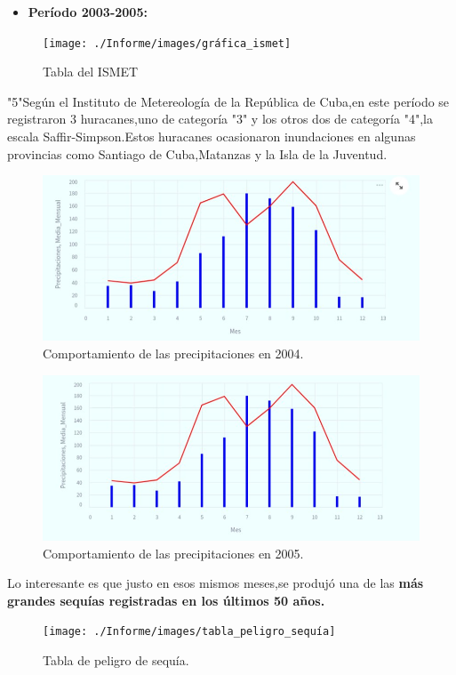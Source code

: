 \documentclass[12pt]{article}
\begin{document}
\begin{itemize}
	\item\textbf{Período 2003-2005:}
\end{itemize}

\begin{figure}[H]
	\centering
	\texttt{[image: ./Informe/images/gráfica\_ismet]}
	\caption{Tabla del ISMET}
	\label{fig:graficaismet}
\end{figure}


"5"Según el Instituto de Metereología de la República de Cuba,en este período se registraron 3 huracanes,uno de categoría "3" y los otros dos de categoría "4",la escala Saffir-Simpson.Estos huracanes ocasionaron inundaciones en algunas provincias como Santiago de Cuba,Matanzas y la Isla de la Juventud.\\


\begin{figure}[H]
	\centering
	\includegraphics[width=0.7\linewidth]{./Informe/images/precipitaciones_2004}
	\caption{Comportamiento de las precipitaciones en 2004.}
	\label{fig:precipitaciones2004}
\end{figure}


\begin{figure}[H]
	\centering
	\includegraphics[width=0.7\linewidth]{./Informe/images/precipitaciones_2005}
	\caption{Comportamiento de las precipitaciones en 2005.}
	\label{fig:precipitaciones2005}
\end{figure}


Lo interesante es que justo en esos mismos meses,se produjó una de las\textbf{ más grandes sequías registradas en los últimos 50 años.}


\begin{figure}[H]
	\centering
	\texttt{[image: ./Informe/images/tabla\_peligro\_sequía]}
	\caption{Tabla de peligro de sequía.}
	\label{fig:tablapeligrosequia}
\end{figure}
\end{document}
